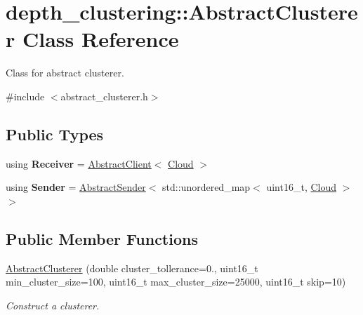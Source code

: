 \hypertarget{classdepth__clustering_1_1AbstractClusterer}{}\section{depth\+\_\+clustering\+:\+:Abstract\+Clusterer Class Reference}
\label{classdepth__clustering_1_1AbstractClusterer}


Class for abstract clusterer.  




{\ttfamily \#include $<$abstract\+\_\+clusterer.\+h$>$}

\subsection*{Public Types}
\begin{DoxyCompactItemize}
\item 
\mbox{\label{classdepth__clustering_1_1AbstractClusterer_a6417b572cb4d8e851fa5bb88eacfdeb4}} 
using {\bfseries Receiver} = \hyperlink{classdepth__clustering_1_1AbstractClient}{Abstract\+Client}$<$ \hyperlink{classdepth__clustering_1_1Cloud}{Cloud} $>$
\item 
\mbox{\label{classdepth__clustering_1_1AbstractClusterer_a916148ff0737bb829b47ec704df8e5a4}} 
using {\bfseries Sender} = \hyperlink{classdepth__clustering_1_1AbstractSender}{Abstract\+Sender}$<$ std\+::unordered\+\_\+map$<$ uint16\+\_\+t, \hyperlink{classdepth__clustering_1_1Cloud}{Cloud} $>$ $>$
\end{DoxyCompactItemize}
\subsection*{Public Member Functions}
\begin{DoxyCompactItemize}
\item 
\hyperlink{classdepth__clustering_1_1AbstractClusterer_a6be8ef3c30066a96e1efa0f082634ed0}{Abstract\+Clusterer} (double cluster\+\_\+tollerance=0., uint16\+\_\+t min\+\_\+cluster\+\_\+size=100, uint16\+\_\+t max\+\_\+cluster\+\_\+size=25000, uint16\+\_\+t skip=10)
\begin{DoxyCompactList}\small\item\em Construct a clusterer. \end{DoxyCompactList}\end{DoxyCompactItemize}
